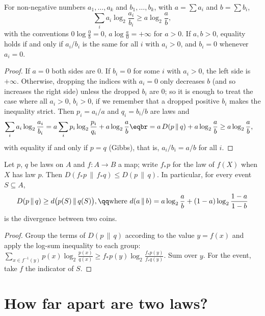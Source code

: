 \begin{lemma}\label{lem:logsum}
For non-negative numbers $a_1,\dots,a_k$ and $b_1,\dots,b_k$, with $a=\sum a_i$ and $b=\sum b_i$,
\[
\sum_ia_i\log_2\frac{a_i}{b_i}\ge a\log_2\frac ab,
\]
with the conventions $0\log\frac0b=0$, $a\log\frac a0=+\infty$ for $a>0$. If $a,b>0$, equality holds if and only if $a_i/b_i$ is the same for all $i$ with $a_i>0$, and $b_i=0$ whenever $a_i=0$.
\end{lemma}

\begin{proof}
If $a=0$ both sides are $0$. If $b_i=0$ for some $i$ with $a_i>0$, the left side is $+\infty$. Otherwise, dropping the indices with $a_i=0$ only decreases $b$ (and so increases the right side) unless the dropped $b_i$ are $0$; so it is enough to treat the case where all $a_i>0$, $b_i>0$, if we remember that a dropped positive $b_i$ makes the inequality strict. Then $p_i=a_i/a$ and $q_i=b_i/b$ are laws and
\[
\begin{aligned}\sum_ia_i\log_2\frac{a_i}{b_i}&=a\sum_ip_i\log_2\frac{p_i}{q_i}+a\log_2\frac ab\eqbr=a\,D(p\,\|\,q)+a\log_2\frac ab\ge a\log_2\frac ab,\end{aligned}
\]
with equality if and only if $p=q$ (Gibbs), that is, $a_i/b_i=a/b$ for all $i$.
\end{proof}

\begin{proposition}\label{prop:dpdiv}
Let $p$, $q$ be laws on $A$ and $f:A\to B$ a map; write $f_*p$ for the law of $f(X)$ when $X$ has law $p$. Then $D(f_*p\,\|\,f_*q)\le D(p\,\|\,q)$. In particular, for every event $S\subseteq A$,
\[
D(p\,\|\,q)\ge d\bigl(p(S)\,\|\,q(S)\bigr),\qq\text{where }d(a\,\|\,b)=a\log_2\frac ab+(1-a)\log_2\frac{1-a}{1-b}
\]
is the divergence between two coins.
\end{proposition}

\begin{proof}
Group the terms of $D(p\,\|\,q)$ according to the value $y=f(x)$ and apply the log-sum inequality to each group: $\sum_{x\in f^{-1}(y)}p(x)\log_2\frac{p(x)}{q(x)}\ge f_*p(y)\log_2\frac{f_*p(y)}{f_*q(y)}$. Sum over $y$. For the event, take $f$ the indicator of $S$.
\end{proof}

\section{How far apart are two laws?}\label{sec:pinsker}

